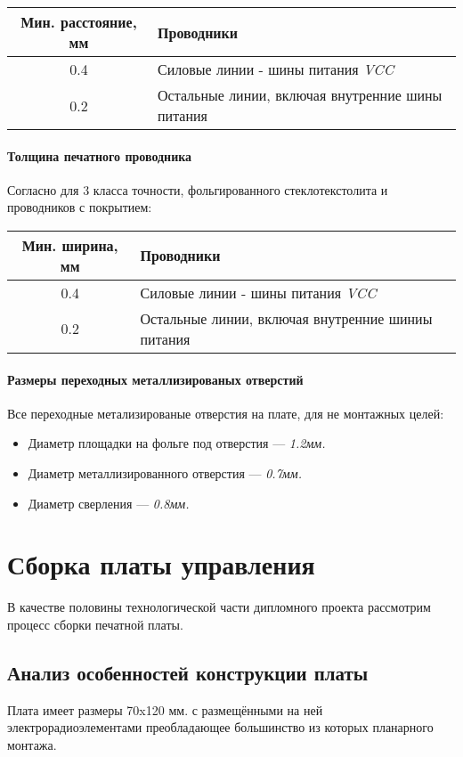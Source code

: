\documentclass{article}
\begin{document}
\begin{tabular}{|c|l|}
    \hline
    Мин. расстояние, мм & Проводники \\
    \hline
    0.4 & Силовые линии - шины питания \textit{VCC} \\
    \hline
    0.2 & Остальные линии, включая внутренние шины питания \\
    \hline
\end{tabular}

\paragraph{Толщина печатного проводника}
Согласно \cite[Табл. 9]{GOST_23751_86} для 3 класса точности,
фольгированного стеклотекстолита и проводников с покрытием:

\begin{tabular}{|c|l|}
    \hline
    Мин. ширина, мм & Проводники \\
    \hline
    0.4 & Силовые линии - шины питания \textit{VCC} \\
    \hline
    0.2 & Остальные линии, включая внутренние шиниы питания \\
    \hline
\end{tabular}

\paragraph{Размеры переходных металлизированых отверстий}
Все переходные метализированые отверстия на плате, для не монтажных целей:

\begin{itemize}
    \item Диаметр площадки на фольге под отверстия --- \textit{1.2мм.}
    \item Диаметр металлизированного отверстия --- \textit{0.7мм.}
    \item Диаметр сверления --- \textit{0.8мм.}
\end{itemize}

\section{Сборка платы управления}
В качестве половины технологической части дипломного проекта рассмотрим
процесс сборки печатной платы.

\subsection{Анализ особенностей конструкции платы}
Плата имеет размеры 70x120 мм. с размещёнными на ней электрорадиоэлементами
преобладающее большинство из которых планарного монтажа.
\end{document}

